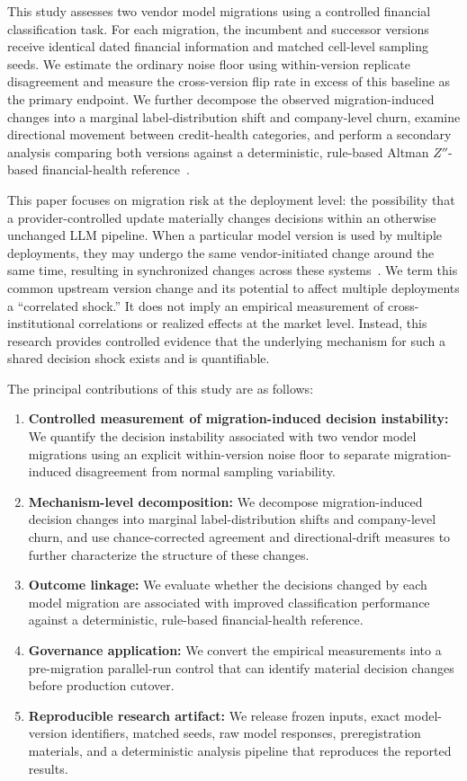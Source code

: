 \documentclass[11pt]{article}
\begin{document}
This study assesses two vendor model migrations using a controlled financial classification task. For each migration, the incumbent and successor versions receive identical dated financial information and matched cell-level sampling seeds. We estimate the ordinary noise floor using within-version replicate disagreement and measure the cross-version flip rate in excess of this baseline as the primary endpoint. We further decompose the observed migration-induced changes into a marginal label-distribution shift and company-level churn, examine directional movement between credit-health categories, and perform a secondary analysis comparing both versions against a deterministic, rule-based Altman $Z''$-based financial-health reference~\cite{altman,altman_em}.

This paper focuses on migration risk at the deployment level: the possibility that a provider-controlled update materially changes decisions within an otherwise unchanged LLM pipeline. When a particular model version is used by multiple deployments, they may undergo the same vendor-initiated change around the same time, resulting in synchronized changes across these systems~\cite{kim,systemic,homog,esrb}. We term this common upstream version change and its potential to affect multiple deployments a ``correlated shock.'' It does not imply an empirical measurement of cross-institutional correlations or realized effects at the market level. Instead, this research provides controlled evidence that the underlying mechanism for such a shared decision shock exists and is quantifiable.

The principal contributions of this study are as follows:
\begin{enumerate}
\item \textbf{Controlled measurement of migration-induced decision instability:} We quantify the decision instability associated with two vendor model migrations using an explicit within-version noise floor to separate migration-induced disagreement from normal sampling variability.
\item \textbf{Mechanism-level decomposition:} We decompose migration-induced decision changes into marginal label-distribution shifts and company-level churn, and use chance-corrected agreement and directional-drift measures to further characterize the structure of these changes.
\item \textbf{Outcome linkage:} We evaluate whether the decisions changed by each model migration are associated with improved classification performance against a deterministic, rule-based financial-health reference.
\item \textbf{Governance application:} We convert the empirical measurements into a pre-migration parallel-run control that can identify material decision changes before production cutover.
\item \textbf{Reproducible research artifact:} We release frozen inputs, exact model-version identifiers, matched seeds, raw model responses, preregistration materials, and a deterministic analysis pipeline that reproduces the reported results.
\end{enumerate}
\end{document}
